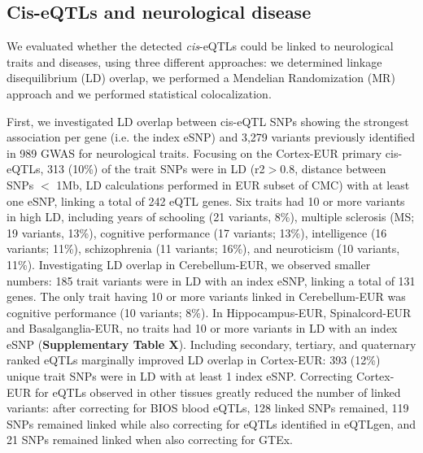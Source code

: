 {{\subsection{Cis-eQTLs and neurological disease}

We evaluated whether the detected \emph{cis}-eQTLs could be linked to neurological traits and diseases, using three different approaches: we determined linkage disequilibrium (LD) overlap, we performed a Mendelian Randomization (MR) approach and we performed statistical colocalization. 

First, we investigated LD overlap between cis-eQTL SNPs showing the strongest association per gene (i.e. the index eSNP) and 3,279 variants previously identified in 989 GWAS for neurological traits. Focusing on the Cortex-EUR primary cis-eQTLs, 313 (10\%) of the trait SNPs were in LD (r2$>$0.8, distance between SNPs $<$ 1Mb, LD calculations performed in EUR subset of CMC) with at least one eSNP, linking a total of 242 eQTL genes. Six traits had 10 or more variants in high LD, including years of schooling (21 variants, 8\%), multiple sclerosis (MS; 19 variants, 13\%), cognitive performance (17 variants; 13\%), intelligence (16 variants; 11\%), schizophrenia (11 variants; 16\%), and neuroticism (10 variants, 11\%). Investigating LD overlap in Cerebellum-EUR, we observed smaller numbers: 185 trait variants were in LD with an index eSNP, linking a total of 131 genes. The only trait having 10 or more variants linked in Cerebellum-EUR was cognitive performance (10 variants; 8\%). In Hippocampus-EUR, Spinalcord-EUR and Basalganglia-EUR, no traits had 10 or more variants in LD with an index eSNP (\textbf{Supplementary Table X}). Including secondary, tertiary, and quaternary ranked eQTLs marginally improved LD overlap in Cortex-EUR: 393 (12\%) unique trait SNPs were in LD with at least 1 index eSNP. Correcting Cortex-EUR for eQTLs observed in other tissues greatly reduced the number of linked variants: after correcting for BIOS blood eQTLs, 128 linked SNPs remained, 119 SNPs remained linked while also correcting for eQTLs identified in eQTLgen, and 21 SNPs remained linked when also correcting for GTEx.

}}
